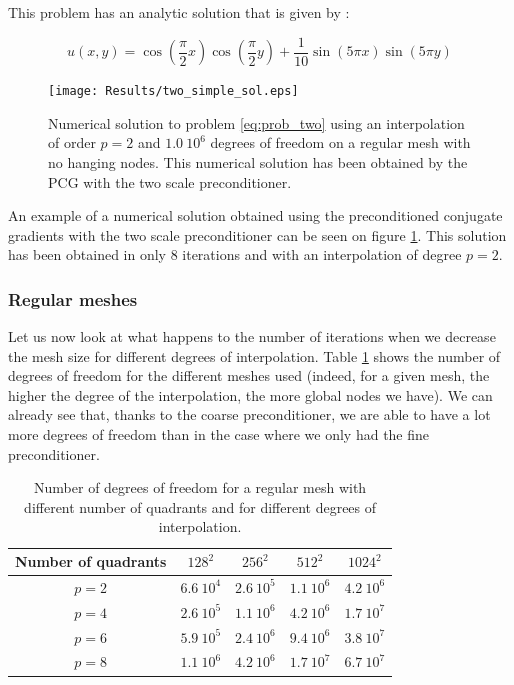 This problem has an analytic solution that is given by : 

$$ u(x,y) = \cos(\frac{\pi}{2}x)\cos(\frac{\pi}{2}y) + \frac{1}{10}\sin(5\pi x)\sin(5\pi y)$$

\begin{figure}
\centering
\texttt{[image: Results/two\_simple\_sol.eps]}
\caption{Numerical solution to problem \ref{eq:prob_two} using an interpolation of order $p=2$ and $1.0\:10^{6}$ degrees of freedom on a regular mesh with no hanging nodes. This numerical solution has been obtained by the PCG with the two scale preconditioner.}
\label{two_simple_sol}
\end{figure}


An example of a numerical solution obtained using the preconditioned conjugate gradients with the two scale preconditioner can be seen on figure \ref{two_simple_sol}. This solution has been obtained in only 8 iterations and with an interpolation of degree $p=2$. 

\subsubsection{Regular meshes}

Let us now look at what happens to the number of iterations when we decrease the mesh size for different degrees of interpolation. Table \ref{two_table_reg} shows the number of degrees of freedom for the different meshes used (indeed, for a given mesh, the higher the degree of the interpolation, the more global nodes we have). We can already see that, thanks to the coarse preconditioner, we are able to have a lot more degrees of freedom than in the case where we only had the fine preconditioner.

\begin{table}
\centering
\begin{tabular}{c|cccc}
\hline
Number of quadrants & $128^2$ & $256^2$ & $512^2$ & $1024^2$\\
\hline
$p=2$ & $6.6\:10^4$ & $2.6\:10^5$ & $1.1\:10^6$ & $4.2\:10^6$ \\
$p=4$ & $2.6\:10^5$ & $1.1\:10^6$ & $4.2\:10^6$ & $1.7\:10^7$ \\
$p=6$ & $5.9\:10^5$ & $2.4\:10^6$ & $9.4\:10^6$ & $3.8\:10^7$ \\
$p=8$ & $1.1\:10^6$ & $4.2\:10^6$ & $1.7\:10^7$ & $6.7\:10^7$ \\
\hline
\end{tabular}
\caption{Number of degrees of freedom for a regular mesh with different number of quadrants and for different degrees of interpolation.}
\label{two_table_reg}
\end{table}


